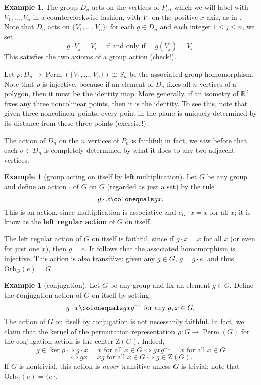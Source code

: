 \documentclass[12pt]{report}
\numberwithin{equation}{section}
\numberwithin{theorem}{chapter}
\theoremstyle{definition}
\newtheorem{example}[theorem]{Example}
\newtheorem*{basic properties}{Basic Properties}
\newtheorem*{Important Remark}{Important Remark}
\newcommand{\df}[1]{{\bf #1}\index{#1}}
\DeclareMathOperator{\Perm}{Perm}
\renewcommand{\ker}{\operatorname{ker}}
\begin{document}
\begin{example} 
The group $D_{n}$ acts on the vertices of $P_n$, which we will label with $V_1, \dots, V_{n}$ in a counterclockwise fashion, with $V_1$ on the positive $x$-axis, as in .
Note that $D_{n}$ acts on $\{V_1, \dots, V_n \}$: for each $g \in D_{n}$ and each integer $1 \leqslant j \leqslant n$, we set 
$$g \cdot V_j = V_i \quad \textrm{ if and only if } \quad g(V_j)=V_i.$$
This satisfies the two axioms of a group action (check!).

Let $\rho\!: D_{n} \to \Perm\left(\{V_1,\ldots,V_n\}\right)\cong S_n$ be the associated group homomorphism. Note that $\rho$ is injective, because if an element  of $D_{n}$ fixes all $n$ vertices of a polygon, then it must be the identity map. More generally, if an isometry of $\mathbb{R}^2$ fixes any three noncolinear points, then it is the identity. To see this, note that given three noncolinear points, every point in the plane is uniquely determined by its distance from these three points (exercise!).

The action of $D_{n}$ on the $n$ vertices of $P_n$ is faithful; in fact, we saw before that each $\sigma \in D_n$ is completely determined by what it does to any two adjacent vertices.
\end{example}


\begin{example}[group acting on itself by left multiplication]
Let $G$ be any group and define an action $\cdot$ of $G$ on $G$ (regarded as just a set) by the rule
$$g \cdot x \colonequals g  x.$$
This is an action, since multiplication is associative and $e_G \cdot x = x$ for all $x$; it is know as the \df{left regular action} of $G$ on itself.

The left regular action of $G$ on itself is faithful, since if $g \cdot x = x$ for all $x$ (or even for just one $x$), then $g = e$. It follows that the associated homomorphism is injective.
This action is also transitive: given any $g \in G$, $g = g \cdot e$, and thus $\mathrm{Orb}_G(e) = G$.
\end{example}



\begin{example}[conjugation]
Let $G$ be any group and fix an element $g \in G$. Define the {\df conjugation action} of $G$ on itself by setting
$$g\cdot x \colonequals gxg^{-1} \textrm{ for any } g,x\in G.$$
The action of $G$ on itself by conjugation is  not necessarily faithful. In fact, we claim that the kernel of the permutation representation $\rho\!:G\to \Perm(G)$ for the conjugation action is the center $\mathrm{Z}(G)$. Indeed,
$$g\in \ker\rho\iff g\cdot x=x \textrm{ for all } x\in G \iff gxg^{-1}=x \textrm{ for all } x\in G$$
$$ \iff gx=xg \textrm{ for all } x\in G \iff g\in \mathrm{Z}(G). $$
If $G$ is nontrivial, this action is \emph{never} transitive unless $G$ is trivial: note that $\mathrm{Orb}_G(e) = \{ e \}$.
\end{example}
\end{document}
